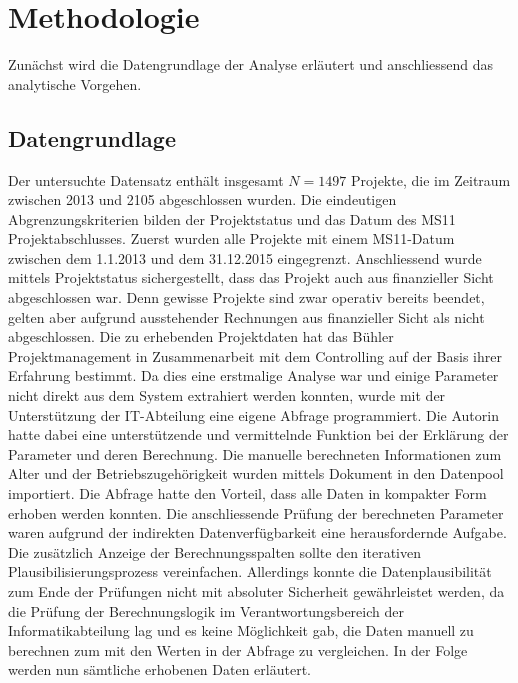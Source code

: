 \chapter{Methodologie}\label{sec:methode}
Zunächst wird die Datengrundlage der Analyse erläutert und anschliessend das analytische Vorgehen. 
\section{Datengrundlage}\label{sec:datagr}
Der untersuchte Datensatz enthält insgesamt $N = 1497$ Projekte, die im Zeitraum zwischen 2013 und 2105 abgeschlossen wurden. Die eindeutigen Abgrenzungskriterien bilden der Projektstatus und das Datum des MS11 Projektabschlusses. Zuerst wurden alle Projekte mit einem MS11-Datum zwischen dem 1.1.2013 und dem 31.12.2015 eingegrenzt. Anschliessend wurde mittels Projektstatus sichergestellt, dass das Projekt auch aus finanzieller Sicht abgeschlossen war. Denn gewisse Projekte sind zwar operativ bereits beendet, gelten aber aufgrund ausstehender Rechnungen aus finanzieller Sicht als \glqq nicht abgeschlossen\grqq. 
\newline\newline
Die zu erhebenden Projektdaten hat das Bühler Projektmanagement in Zusammenarbeit mit dem Controlling auf der Basis ihrer Erfahrung bestimmt. Da dies eine erstmalige Analyse war und einige Parameter nicht direkt aus dem System extrahiert werden konnten, wurde mit der Unterstützung der IT-Abteilung eine eigene Abfrage programmiert. Die Autorin hatte dabei eine unterstützende und vermittelnde Funktion bei der Erklärung der Parameter und deren Berechnung. Die manuelle berechneten Informationen zum Alter und der Betriebszugehörigkeit wurden mittels Dokument in den Datenpool importiert. Die Abfrage hatte den Vorteil, dass alle Daten in kompakter Form erhoben werden konnten. Die anschliessende Prüfung der berechneten Parameter waren aufgrund der indirekten Datenverfügbarkeit eine herausfordernde Aufgabe. Die zusätzlich Anzeige der Berechnungsspalten sollte den iterativen Plausibilisierungsprozess vereinfachen. Allerdings konnte die Datenplausibilität zum Ende der Prüfungen nicht mit absoluter Sicherheit gewährleistet werden, da die Prüfung der Berechnungslogik im Verantwortungsbereich der Informatikabteilung lag und es keine Möglichkeit gab, die Daten manuell zu berechnen zum mit den Werten in der Abfrage zu vergleichen. In der Folge werden nun sämtliche erhobenen Daten erläutert.
